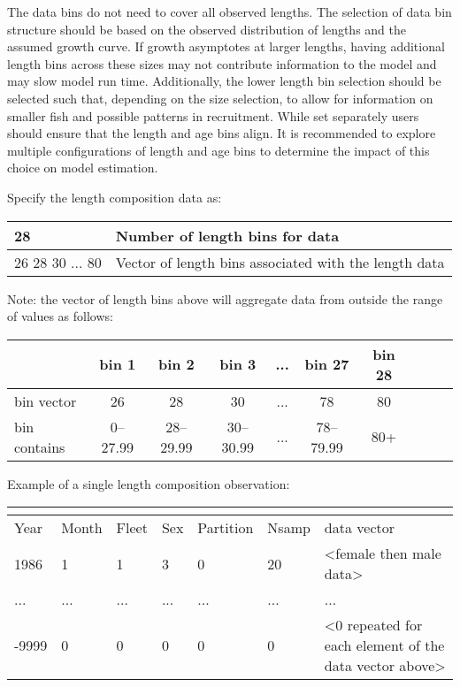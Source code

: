 The data bins do not need to cover all observed lengths. The selection of data bin structure should be based on the observed distribution of lengths and the assumed growth curve. If growth asymptotes at larger lengths, having additional length bins across these sizes may not contribute information to the model and may slow model run time. Additionally, the lower length bin selection should be selected such that, depending on the size selection, to allow for information on smaller fish and possible patterns in recruitment. While set separately users should ensure that the length and age bins align. It is recommended to explore multiple configurations of length and age bins to determine the impact of this choice on model estimation.

Specify the length composition data as:
\begin{center}
	\begin{tabular}{p{4cm} p{10cm}}
		\hline
		28 & Number of length bins for data \\
		\hline
		26 28 30 ... 80 & Vector of length bins associated with the length data \\
		\hline
	\end{tabular}
\end{center}
Note: the vector of length bins above will aggregate data from outside
the range of values as follows:
\begin{center}
    \begin{tabular}{lccccccccc}
		\hline
  		             & bin 1 & bin 2 & bin 3 & ... & bin 27 & bin 28 \\ 
		\hline
 		bin vector   & 26 & 28 & 30 & ... & 78 & 80 \\ 
    	bin contains & 0--27.99 & 28--29.99 & 30--30.99 & ... & 78--79.99 & 80+ \\
		\hline
    \end{tabular}
\end{center}

Example of a single length composition observation:
\vspace*{-1cm} %
\begin{center}
	\begin{tabular}{p{1.5cm} p{1.5cm} p{1.5cm} p{1.5cm} p{1.5cm} p{1.5cm} p{5cm}}
		\multicolumn{7}{l}{} \\
		\hline
		Year & Month & Fleet & Sex & Partition & Nsamp & data vector \Tstrut\Bstrut\\
		\hline
		1986 & 1 & 1 & 3 & 0 & 20 & <female then male data> \Tstrut\\
		... & ... & ... & ... & ... & ... & ... \\
		-9999 & 0 & 0 & 0 & 0 & 0 & <0 repeated for each element of the data vector above> \Bstrut\\
		\hline	
	\end{tabular}
\end{center}

